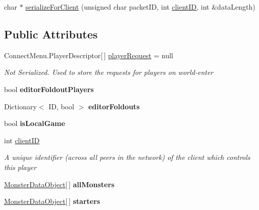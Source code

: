 \begin{DoxyCompactItemize}
\item 
char $\ast$ \hyperlink{class_game_state_a291fcda337b1a25c21871fe338399c27}{serialize\-For\-Client} (unsigned char packet\-I\-D, int \hyperlink{class_game_state_a7c5acf663dc54a1d6de3254209b8fff2}{client\-I\-D}, int \&data\-Length)
\end{DoxyCompactItemize}
\subsection*{Public Attributes}
\begin{DoxyCompactItemize}
\item 
Connect\-Menu.\-Player\-Descriptor\mbox{[}$\,$\mbox{]} \hyperlink{class_game_state_a8b1949523ac8e40776c0617666023d64}{player\-Request} = null
\begin{DoxyCompactList}\small\item\em Not Serialized. Used to store the requests for players on world-\/enter \end{DoxyCompactList}\item 
\hypertarget{class_game_state_ad68ed3f1f32060bfff68d296e6750712}{bool {\bfseries editor\-Foldout\-Players}}\label{class_game_state_ad68ed3f1f32060bfff68d296e6750712}

\item 
\hypertarget{class_game_state_a47358e83d829da7a28c49f8d0a795125}{Dictionary$<$ I\-D, bool $>$ {\bfseries editor\-Foldouts}}\label{class_game_state_a47358e83d829da7a28c49f8d0a795125}

\item 
\hypertarget{class_game_state_aa4cba70bc38a13e80439dc784c6ca12e}{bool {\bfseries is\-Local\-Game}}\label{class_game_state_aa4cba70bc38a13e80439dc784c6ca12e}

\item 
int \hyperlink{class_game_state_a7c5acf663dc54a1d6de3254209b8fff2}{client\-I\-D}
\begin{DoxyCompactList}\small\item\em A unique identifier (across all peers in the network) of the client which controls this player \end{DoxyCompactList}\item 
\hypertarget{class_game_state_a03d53f629e24c1cc8bcb4a8a61f1bb23}{\hyperlink{class_monster_data_object}{Monster\-Data\-Object}\mbox{[}$\,$\mbox{]} {\bfseries all\-Monsters}}\label{class_game_state_a03d53f629e24c1cc8bcb4a8a61f1bb23}

\item 
\hypertarget{class_game_state_a3d88394849f2356b1c1917f8bb9cc873}{\hyperlink{class_monster_data_object}{Monster\-Data\-Object}\mbox{[}$\,$\mbox{]} {\bfseries starters}}\label{class_game_state_a3d88394849f2356b1c1917f8bb9cc873}


\end{DoxyCompactItemize}
